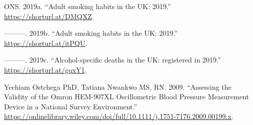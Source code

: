 \documentclass[
  11pt,
  twocolumn]{article}
\newlength{\cslhangindent}
\newlength{\cslentryspacingunit} %
\newenvironment{CSLReferences}[2] %
 {%
  \setlength{\parindent}{0pt}
  \ifodd #1
  \let\oldpar\par
  \def\par{\hangindent=\cslhangindent\oldpar}
  \fi
  \setlength{\parskip}{#2\cslentryspacingunit}
 }%
 {}
\begin{document}
\begin{CSLReferences}{1}{0}
\leavevmode{}%
ONS. 2019a. {``{Adult smoking habits in the UK: 2019}.''}
\url{https://shorturl.at/DMQXZ}.

\leavevmode{}%
---------. 2019b. {``{Adult smoking habits in the UK: 2019}.''}
\url{https://shorturl.at/itPQU}.

\leavevmode{}%
---------. 2019c. {``{Alcohol-specific deaths in the UK: registered in
2019}.''} \url{https://shorturl.at/gqxY1}.

\leavevmode{}%
Yechiam Ostchega PhD, Tatiana Nwankwo MS, RN. 2009. {``{Assessing the
Validity of the Omron HEM-907XL Oscillometric Blood Pressure Measurement
Device in a National Survey Environment}.''}
\url{https://onlinelibrary.wiley.com/doi/full/10.1111/j.1751-7176.2009.00199.x}.

\end{CSLReferences}
\end{document}
